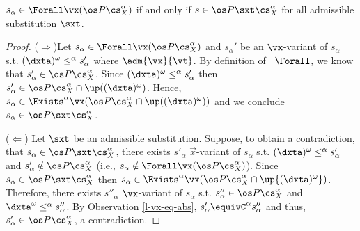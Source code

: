 \documentclass{tlp}
\begin{document}
\begin{proposition}\label{prop:forall-subs-abs}
$s_\alpha \in  \Forall \vx ( \os P \cs^\alpha_X)$ if and only if  $s \in \os P\sxt \cs^\alpha_X$ for all admissible substitution $\sxt$. 
\end{proposition}
\begin{proof}
($\Rightarrow$)Let $s_\alpha\in\Forall \vx ( \os P \cs^\alpha_X)$ and  $s_\alpha'$ be an $\vx$-variant of $s_\alpha$ s.t. $({\dxta})^{\omega} \leq^\alpha s_\alpha'$ where $\adm{\vx}{\vt}$. By definition of~ $\Forall$, we know that $s'_\alpha\in \os P \cs^\alpha_X$. Since $ ({\dxta})^\omega \leq^\alpha s_\alpha'$ then $s_\alpha' \in \os P \cs^\alpha_X \cap \up(({\dxta})^{\omega})$. Hence, $s_\alpha\in \Exists^\alpha \vx (\os P \cs^\alpha_X \cap \up(({\dxta})^{\omega}) )$ and we conclude $s_\alpha \in \os P\sxt\cs^\alpha_X$. 

\noindent($\Leftarrow$) Let $\sxt$ be an admissible substitution. Suppose, to obtain a contradiction, that $s_\alpha \in \os P\sxt\cs^\alpha_X$, there exists $s'_\alpha$ $\vec{x}$-variant of $s_\alpha$ s.t. $({\dxta})^{\omega} \leq^\alpha s'_\alpha$ and $s'_\alpha \notin \os P\cs^\alpha_X$ (i.e., $s_\alpha\notin \Forall\vx (\os P\cs^\alpha_X)$). Since $s_\alpha\in \os P\sxt\cs^\alpha_X$ then $s_\alpha \in \Exists^\alpha \vx (\os P \cs^\alpha_X \cap \up{ ({\dxta})^{\omega}})$.  Therefore, there exists $s''_\alpha$ $\vx$-variant of $s_\alpha$ s.t. $s''_\alpha \in \os P\cs^\alpha_X$ and ${\dxta}^{\omega} \leq^\alpha s''_\alpha$. By Observation \ref{l-vx-eq-abs},  $s'_\alpha\equivC^\alpha s''_\alpha$ and thus,  $s'_\alpha \in \os P \cs^\alpha_X$, a contradiction. 
\end{proof}

 
\end{document}
